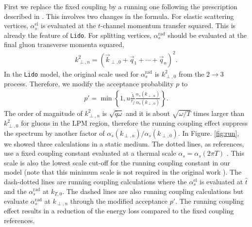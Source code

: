 \documentclass[aps, prc, reprint, amsmath, groupedaddress, nofootinbib]{revtex4-1}
\begin{document}
{First we replace the fixed coupling by a running one following the prescription described in \cite{Arnold:2008zu}.
This involves two changes in the formula. 
For elastic scattering vertices, $\alpha_s^{\textrm{el}}$ is evaluated at the $t$-channel momentum transfer squared. 
This is already the feature of {\tt Lido}.
For splitting vertices,  $\alpha_s^{\textrm{rad}}$ should be evaluated at the final gluon transverse momenta squared,
\begin{eqnarray}\label{eq:kTn}
k_{\perp,n}^2 = \left(\vec{k}_{\perp,0}+\vec{q}_1+\cdots+\vec{q}_n\right)^2.
\end{eqnarray} 
In the {\tt Lido} model, the original scale used for $\alpha_s^{\textrm{rad}}$ is $k_{\perp,0}^2$ from the $2\rightarrow 3$ process.
Therefore, we modify the acceptance probability $p$ to
\begin{eqnarray}
p' = \min\left\{1, u\frac{\tilde{\lambda}}{\tau_f}\frac{\alpha_s(k_{\perp,n})}{\alpha_s(k_{\perp,0})}\right\}.
\end{eqnarray}
The order of magnitude of $k_{\perp,n}^2$ is $\sqrt{\hat{q}\omega}$ and it is about $\sqrt{\omega/T}$ times larger than $k_{\perp,0}^2$ for gluons in the LPM region, therefore the running coupling effect suppress the spectrum by another factor of $\alpha_s(k_{\perp,n})/\alpha_s(k_{\perp,0})$.
In Figure. \ref{fig:run}, we showed three calculations in a static medium. The dotted lines, as references, use a fixed coupling constant evaluated at a thermal scale $\alpha_s = \alpha_s(2\pi T)$ .
This scale is also the lowest scale cut-off for the running coupling constant in our model (note that this minimum scale is not required in the original work \cite{Arnold:2008zu}).
The dash-dotted lines are running coupling calculations where the $\alpha_s^{\textrm{el}}$ is evaluated at $\hat{t}$ and the $\alpha_s^{\textrm{rad}}$ at $k_{T,0}$.
The dashed lines are also running coupling calculations but evaluate $\alpha_s^{\textrm{rad}}$ at $k_{\perp,n}$ through the modified acceptance $p'$.
The running coupling effect results in a reduction of the energy loss compared to the fixed coupling references.

}
\end{document}
